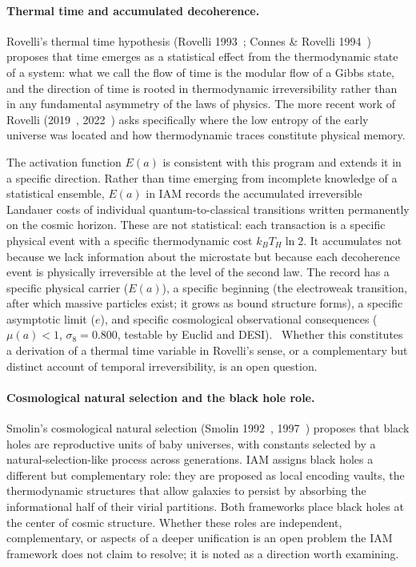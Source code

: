 \paragraph{Thermal time and accumulated decoherence.} Rovelli's thermal time hypothesis (Rovelli 1993~\cite{Rovelli1993}; Connes \& Rovelli
1994~\cite{ConnesRovelli1994}) proposes that time emerges as a statistical effect from the thermodynamic state of a system: what we call the flow of time is
the modular flow of a Gibbs state, and the direction of time is rooted in thermodynamic irreversibility rather than in any fundamental asymmetry of the laws
of physics. The more recent work of Rovelli (2019~\cite{Rovelli2019}, 2022~\cite{Rovelli2022}) asks specifically where the low entropy of the early universe
was located and how thermodynamic traces constitute physical memory.

The activation function $E(a)$ is consistent with this program and extends it in a specific direction. Rather than time emerging from incomplete knowledge
of a statistical ensemble, $E(a)$ in IAM records the accumulated irreversible Landauer costs of individual quantum-to-classical transitions written
permanently on the cosmic horizon. These are not statistical: each transaction is a specific physical event with a specific thermodynamic cost $k_BT_H\ln2$.
It accumulates not because we lack information about the microstate but because each decoherence event is physically irreversible at the level of the
second law. The record has a specific physical carrier ($E(a)$), a specific beginning (the electroweak transition, after which massive particles exist; it grows as bound structure forms), a
specific asymptotic limit ($e$), and specific cosmological observational consequences ($\mu(a)<1$, $\sigma_8=0.800$, testable by Euclid and DESI).
\interp\ Whether this constitutes a derivation of a thermal time variable in Rovelli's sense, or a complementary but distinct account of temporal
irreversibility, is an open question. \openprob

\paragraph{Cosmological natural selection and the black hole role.} Smolin's cosmological natural selection (Smolin 1992~\cite{Smolin1992},
1997~\cite{Smolin1997}) proposes that black holes are reproductive units of baby universes, with constants selected by a natural-selection-like process across
generations. IAM assigns black holes a different but complementary role: they are proposed as local encoding vaults, the thermodynamic structures that allow
galaxies to persist by absorbing the informational half of their virial partitions. Both frameworks place black holes at the center of cosmic structure.
Whether these roles are independent, complementary, or aspects of a deeper unification is an open problem the IAM framework does not claim to resolve; it is
noted as a direction worth examining. \conjecture

